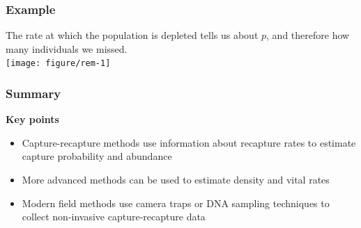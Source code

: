 \documentclass[color=usenames,dvipsnames]{beamer}\usepackage[]{graphicx}\usepackage[]{xcolor}
\newenvironment{knitrout}{}{} %
\begin{document}
\begin{frame}[fragile]
  \frametitle{Example}
  \centering
    The rate at which the population is depleted tells us about $p$,
    and therefore how many individuals we missed. \\  
    \vfill
\begin{knitrout}
\color{fgcolor}
\texttt{[image: figure/rem-1]} 
\end{knitrout}
\end{frame}








\begin{frame}
  \frametitle{Summary}
  \large
  {\bf Key points}
  \begin{itemize}
    \item Capture-recapture methods use information about recapture
      rates to estimate capture probability and abundance
    \item More advanced methods can be used to estimate density and vital rates
    \item Modern field methods use camera traps or DNA sampling techniques to collect non-invasive capture-recapture data
  \end{itemize}
\end{frame}
\end{document}
